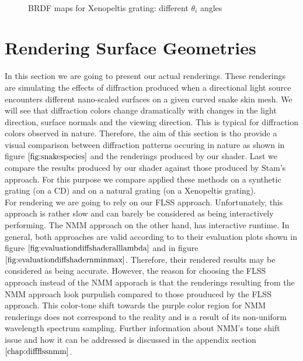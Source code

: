\begin{figure}[H]
  \centering
~
~
  
\caption[BRDF Map: Varying Viewing Angles]{BRDF maps for Xenopeltis grating: different $\theta_i$ angles}
\label{fig:brdfmapsxenodiffthetaiangles}
\end{figure}

\section{Rendering Surface Geometries}
\label{sec:snakegeomrenderings}
In this section we are going to present our actual renderings. These renderings are simulating the effects of diffraction produced when a directional light source encounters different nano-scaled surfaces on a given curved snake skin mesh. We will see that diffraction colors change dramatically with changes in the light direction, surface normals and the viewing direction. This is typical for diffraction colors observed in nature. Therefore, the aim of this section is tho provide a visual comparison between diffraction patterns occuring in nature as shown in figure $\ref{fig:snakespecies}$ and the renderings produced by our shader. Last we compare the results produced by our shader against those produced by Stam's approach. For this purpose we compare applied these methods on a synthetic grating (on a CD) and on a natural grating (on a Xenopeltis grating). \\

For rendering we are going to rely on our FLSS approach. Unfortunately, this approach is rather slow and can barely be considered as being interactively performing. The NMM approach on the other hand, has interactive runtime. In general, both approaches are valid according to to their evaluation plots shown in figure $\ref{fig:evaluationdiffshaderalllambda}$ and in figure $\ref{fig:evaluationdiffshadernminmax}$. Therefore, their rendered results may be considered as being accurate. However, the reason for choosing the FLSS approach instead of the NMM apporach is that the renderings resulting from the NMM approach look purpulish compared to those prouduced by the FLSS approach. This color-tone shift towards the purple color region for NMM renderings does not correspond to the reality and is a result of its non-uniform wavelength spectrum sampling. Further information about NMM's tone shift issue and how it can be addressed is discussed in the appendix section $\ref{chap:diffflssnmm}$. \\

